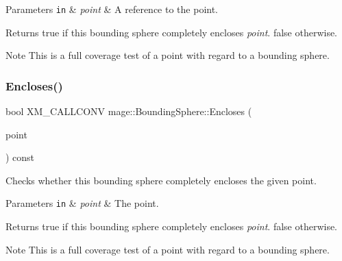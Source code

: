 \begin{DoxyParams}[1]{Parameters}
\mbox{\tt in}  & {\em point} & A reference to the point. \\
\hline
\end{DoxyParams}
\begin{DoxyReturn}{Returns}
{\ttfamily true} if this bounding sphere completely encloses {\itshape point}. {\ttfamily false} otherwise. 
\end{DoxyReturn}
\begin{DoxyNote}{Note}
This is a full coverage test of a point with regard to a bounding sphere. 
\end{DoxyNote}
\hypertarget{classmage_1_1_bounding_sphere_a5174af3edc1f3a5635df5395b54ae352}{}\label{classmage_1_1_bounding_sphere_a5174af3edc1f3a5635df5395b54ae352} 
\subsubsection{\texorpdfstring{Encloses()}{Encloses()}\hspace{0.1cm}{\footnotesize\ttfamily [2/4]}}
{\footnotesize\ttfamily bool X\+M\+\_\+\+C\+A\+L\+L\+C\+O\+NV mage\+::\+Bounding\+Sphere\+::\+Encloses (\begin{DoxyParamCaption}\item[{F\+X\+M\+V\+E\+C\+T\+OR}]{point }\end{DoxyParamCaption}) const\hspace{0.3cm}{\ttfamily [noexcept]}}

Checks whether this bounding sphere completely encloses the given point.


\begin{DoxyParams}[1]{Parameters}
\mbox{\tt in}  & {\em point} & The point. \\
\hline
\end{DoxyParams}
\begin{DoxyReturn}{Returns}
{\ttfamily true} if this bounding sphere completely encloses {\itshape point}. {\ttfamily false} otherwise. 
\end{DoxyReturn}
\begin{DoxyNote}{Note}
This is a full coverage test of a point with regard to a bounding sphere. 
\end{DoxyNote}
\hypertarget{classmage_1_1_bounding_sphere_a35feaaaf141319bdf37fca4da0ed0fc0}{}\label{classmage_1_1_bounding_sphere_a35feaaaf141319bdf37fca4da0ed0fc0} 
